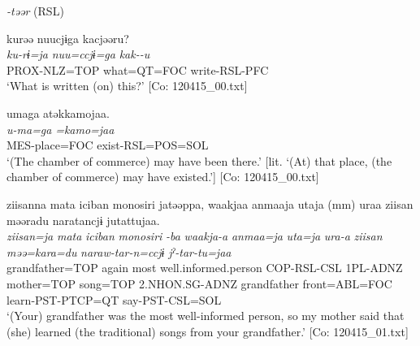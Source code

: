 \exi{} \textit{{}-təər} (RSL)

\ex \label{ex:9.9c} %
     \glll     kurəə  nuucjɨga  kacjəəru?\\
      \textit{ku-rɨ=ja}  \textit{nuu=ccjɨ=ga}  \textit{kak--u}\\
      PROX-NLZ=TOP  what=QT=FOC  write-RSL-PFC\\
      \glt       ‘What is written (on) this?’ [Co: 120415\_00.txt]

\ex \label{ex:9.9d} %
      \glll  umaga  atəkkamojaa.\\
      \textit{u-ma=ga}  \textit{=kamo=jaa}\\
      MES-place=FOC  exist-RSL=POS=SOL\\
      \glt       ‘(The chamber of commerce) may have been there.’ [lit. ‘(At) that place, (the chamber of commerce) may have existed.’] [Co: 120415\_00.txt]

\ex \label{9.9e} %
      \glll ziisanna  mata  {\textbar}iciban  monosiri{\textbar}  jatəəppa,  waakjaa  anmaaja  utaja  (mm)  uraa  ziisan  məəradu  naratancjɨ  jutattujaa.\\
      \textit{ziisan=ja}  \textit{mata}  \textit{iciban}  \textit{monosiri}  \textit{-ba}  \textit{waakja-a}  \textit{anmaa=ja}  \textit{uta=ja}    \textit{ura-a}   \textit{ziisan} \textit{məə=kara=du}  \textit{naraw-tar-n=ccjɨ}  \textit{jˀ-tar-tu=jaa}\\
      grandfather=TOP  again  most  well.informed.person  COP-RSL-CSL  1PL-ADNZ  mother=TOP  song=TOP    2.NHON.SG-ADNZ   grandfather  front=ABL=FOC  learn-PST-PTCP=QT  say-PST-CSL=SOL\\      
      \glt  ‘(Your) grandfather was the most well-informed person, so my mother said that (she) learned (the traditional) songs from your grandfather.’ [Co: 120415\_01.txt]
    \z
\z

